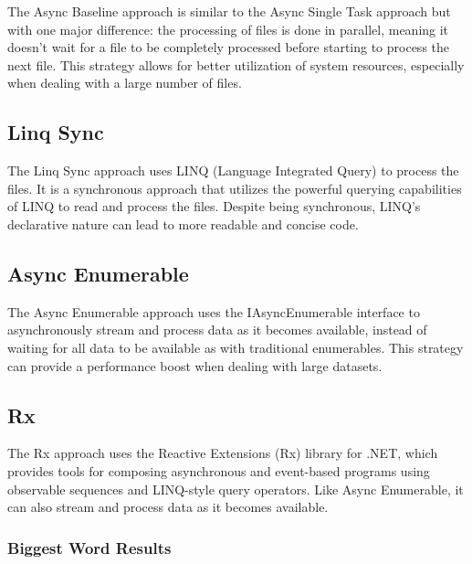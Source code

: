 The Async Baseline approach is similar to the Async Single Task approach but with one major difference: the processing of files is done in parallel, meaning it doesn't wait for a file to be completely processed before starting to process the next file. This strategy allows for better utilization of system resources, especially when dealing with a large number of files. 

\subsection{Linq Sync}

The Linq Sync approach uses LINQ (Language Integrated Query) to process the files. It is a synchronous approach that utilizes the powerful querying capabilities of LINQ to read and process the files. Despite being synchronous, LINQ's declarative nature can lead to more readable and concise code.

\subsection{Async Enumerable}

The Async Enumerable approach uses the IAsyncEnumerable interface to asynchronously stream and process data as it becomes available, instead of waiting for all data to be available as with traditional enumerables. This strategy can provide a performance boost when dealing with large datasets.

\subsection{Rx}

The Rx approach uses the Reactive Extensions (Rx) library for .NET, which provides tools for composing asynchronous and event-based programs using observable sequences and LINQ-style query operators. Like Async Enumerable, it can also stream and process data as it becomes available.


\subsubsection{Biggest Word Results}
\label{subsubsec:biggest_word_results_cs}

